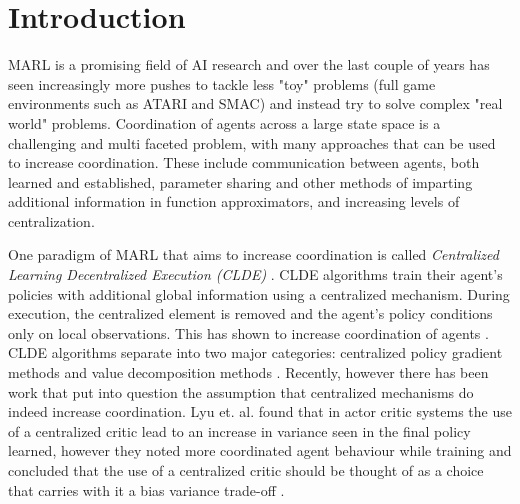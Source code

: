 \documentclass[systems,article,submit,pdftex,moreauthors]{Definitions/mdpi}
\begin{document}
\maketitle


\section{Introduction}

MARL is a promising field of AI research and over the last couple of years has seen increasingly more pushes to tackle less "toy" problems (full game environments such as ATARI and SMAC) and instead try to solve complex "real world" problems. 
Coordination of agents across a large state space is a challenging and multi faceted problem, with many approaches that can be used to increase coordination. These include communication between agents, both learned and established, parameter sharing and other methods of imparting additional information in function approximators, and increasing levels of centralization. 

One paradigm of MARL that aims to increase coordination is called \textit{Centralized Learning Decentralized Execution (CLDE)} \cite{Oliehoek2016}. CLDE algorithms train their agent's policies with additional global information using a centralized mechanism. During execution, the centralized element is removed and the agent's policy conditions only on local observations. This has shown to increase coordination of agents \cite{DBLP:Benchmarking}. CLDE algorithms separate into two major categories: centralized policy gradient methods \cite{DBLP:A3C, DBLP:MAPPO, DBLP:maddpg} and value decomposition methods \cite{DBLP:Qmix, sunehag2017vdn}.
Recently, however there has been work that put into question the assumption that centralized mechanisms do indeed increase coordination. Lyu et. al. \cite{DBLP:contrastingCentralizedDecentralized} found that in actor critic systems the use of a centralized critic lead to an increase in variance seen in the final policy learned, however they noted more coordinated agent behaviour while training and concluded that the use of a centralized critic should be thought of as a choice that carries with it a bias variance trade-off .    
\end{document}
